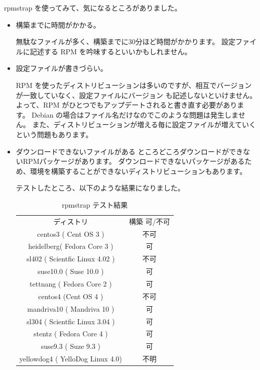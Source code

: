 \documentclass[mingoth,a4paper]{jsarticle}
\begin{document}
rpmstrap を使ってみて、気になるところがありました。
\begin{itemize}
\item 構築までに時間がかかる。

	無駄なファイルが多く、構築までに30分ほど時間がかかります。
	設定ファイルに記述する RPM を吟味するといいかもしれません。

\item 設定ファイルが書きづらい。

	RPM を使ったディストリビューションは多いのですが、相互でバージョンが一致していなく、設定ファイルにバージョン
	も記述しないといけません。よって、RPM がひとつでもアップデートされると書き直す必要があります。
	Debian の場合はファイル名だけなのでこのような問題は発生しません。
	また、ディストリビューションが増える毎に設定ファイルが増えていくという問題もあります。

\item ダウンロードできないファイルがある
	ところどころダウンロードができないRPMパッケージがあります。
	ダウンロードできないパッケージがあるため、環境を構築することができないディストリビューションもあります。
	
	テストしたところ、以下のような結果になりました。
\begin{table}[h]
\begin{center}
\caption{rpmstrap テスト結果}
\label{tbl:a1}
\begin{tabular}{|c|c|}
\hline
ディストリ & 構築 可/不可 \\
\cline{1-2}
 centos3  ( Cent OS 3 ) & 不可 \\
 \hline
 heidelberg( Fedora Core 3 )  & 可 \\
 \hline
 sl402 ( Scientfic Linux 4.02 )   & 不可 \\
 \hline
 suse10.0  ( Suse 10.0 )& 可 \\
\hline
 tettnang ( Fedora Core 2 )& 可 \\
\hline
 centos4  (Cent OS 4 )   & 不可 \\
\hline
 mandriva10 ( Mandriva 10 )& 可 \\
\hline
 sl304  ( Scientfic Linux 3.04 )  & 可 \\ 
\hline 
 stentz ( Fedora Core 4 )  & 可 \\
\hline 
 suse9.3  ( Suze 9.3 )   & 可\\		
\hline 
 yellowdog4 ( YelloDog Linux 4.0)& 不明 \\
\hline
\end{tabular}
\end{center}
\end{table}
\end{itemize}
\end{document}
